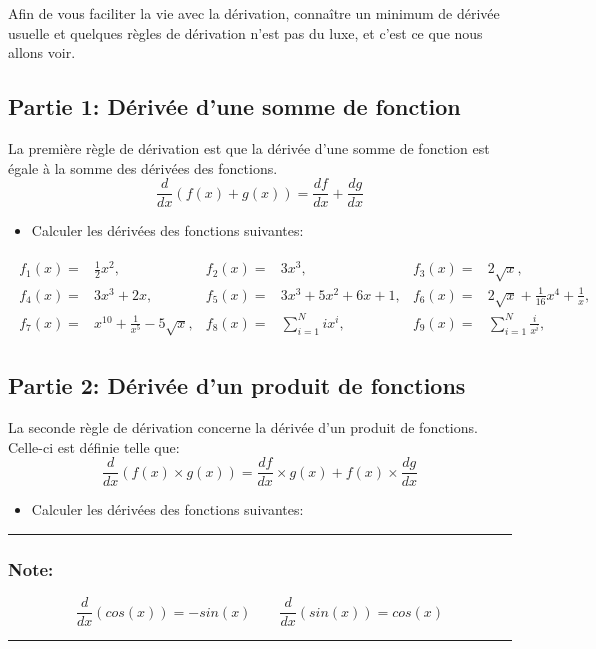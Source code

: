 \documentclass[11pt, french]{article}
\begin{document}
Afin de vous faciliter la vie avec la dérivation, connaître un minimum de dérivée usuelle et quelques règles de dérivation n'est pas du luxe, et c'est ce que nous allons voir.

\subsection*{Partie 1: Dérivée d'une somme de fonction}
La première règle de dérivation est que la dérivée d'une somme de fonction est égale à la somme des dérivées des fonctions.
\begin{equation*}
\frac{d}{dx}(f(x)+g(x)) = \frac{df}{dx} + \frac{dg}{dx}
\end{equation*}

\begin{itemize}
    \item Calculer les dérivées des fonctions suivantes:
\end{itemize}

\begin{align*}
\begin{matrix}
f_1(x) =& \frac{1}{2}x^2, & f_2(x) = & 3x^3,                & f_3(x) = & 2\sqrt{x},\\
f_4(x) =& 3x^3 + 2x,      & f_5(x) = & 3x^3+ 5x^2 + 6x + 1, & f_6(x) = & 2\sqrt{x}+ \frac{1}{16}x^4 + \frac{1}{x},\\
f_7(x) =& x^10 + \frac{1}{x^5} - 5\sqrt{x}, & f_8(x) = & \sum_{i=1}^{N}ix^i, & f_9(x) = & \sum_{i=1}^{N}\frac{i}{x^i},
\end{matrix}
\end{align*}

\subsection*{Partie 2: Dérivée d'un produit de fonctions}
La seconde règle de dérivation concerne la dérivée d'un produit de fonctions. Celle-ci est définie telle que:
\begin{equation*}
    \frac{d}{dx}(f(x)\times g(x)) = \frac{df}{dx}\times g(x) + f(x) \times \frac{dg}{dx}
\end{equation*}

\begin{itemize}
    \item Calculer les dérivées des fonctions suivantes:
\end{itemize}

\noindent\rule{\textwidth}{1pt}
\subsubsection*{Note:}
\begin{equation*}
    \frac{d}{dx} \left( cos(x)\right) = -sin(x) \quad \quad \frac{d}{dx} \left( sin(x)\right) = cos(x)
\end{equation*}
\noindent\rule{\textwidth}{1pt}
\end{document}
